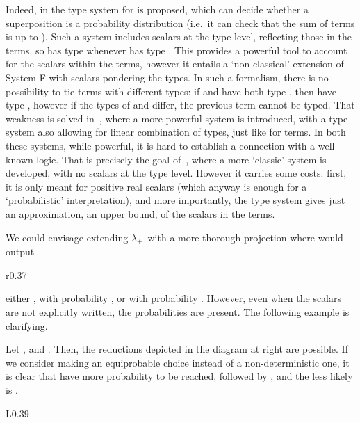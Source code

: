 \documentclass[final,copyright,creativecommons]{eptcs}
\newcommand{\OurCalculus}{\ensuremath{\lambda_+}}
\theoremstyle{definition}
\begin{document}
Indeed, in \cite[\S6]{ArrighiDiazcaroLMCS12} the type system  for  is proposed, which can decide whether a superposition is a probability distribution (i.e.~it can check that the sum of terms is up to ). Such a system includes scalars at the type level, reflecting those in the terms, so  has type  whenever  has type . This provides a powerful tool to account for the scalars within the terms, however it entails a `non-classical' extension of System F with scalars pondering the types. In such a formalism, there is no possibility to tie terms with different types: if  and  have both type , then  have type , however if the types of  and  differ, the previous term cannot be typed.
That weakness is solved in~\cite{ArrighiDiazcaroValironDCM11}, where a more powerful system is introduced, with a type system also allowing for linear combination of types, just like for terms. In both these systems, while powerful, it is hard to establish a connection with a well-known logic. That is precisely the goal of~\cite{BuirasDiazcaroJaskelioffLSFA11}, where a more `classic' system is developed, with no scalars at the type level. However it carries some costs: first, it is only meant for positive real scalars (which anyway is enough for a `probabilistic' interpretation), and more importantly, the type system gives just an approximation, an upper bound, of the scalars in the terms.

We could envisage extending \OurCalculus\ with a more thorough projection where  would output
\begin{wrapfigure}{r}{0.37\textwidth}
  \begin{center}\vspace{-0.2in}
\end{center}
\end{wrapfigure}
either , with probability , or  with probability . However, even when the scalars are not explicitly written, the probabilities are present. The following example is clarifying.

Let ,  and . Then, the reductions depicted in the diagram at right are possible. If we consider  making an equiprobable choice instead of a non-deterministic one, it is clear that  have more probability to be reached, followed by , and the less likely is .

\begin{wrapfigure}{L}{0.39\textwidth}
  \begin{center}\vspace{-0.2in}

    \end{center}
\end{wrapfigure}
\end{document}
